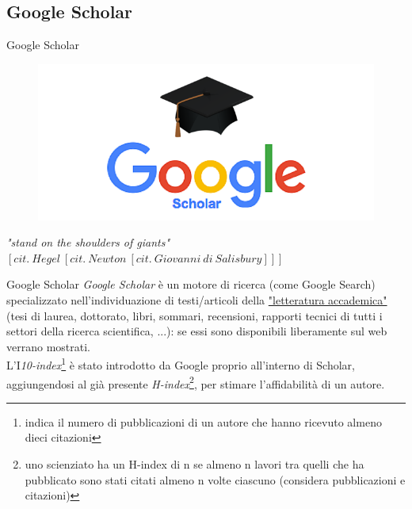 \documentclass{beamer}
\begin{document}
\subsection{Google Scholar}
\begin{frame}{Google Scholar}
\begin{figure}[h!]
\includegraphics[width=0.5\linewidth]{immagini/scholar.png}
\end{figure}
\begin{block}{}
\begin{center}
\textit{"stand on the shoulders of giants"}\\
$[cit.\ Hegel\ [cit.\ Newton\ [cit.\ Giovanni\ di\ Salisbury]]]$\\
\end{center}
\end{block}
\end{frame}
\begin{frame}{Google Scholar}
\textit{Google Scholar} è un motore di ricerca (come Google Search) specializzato nell'individuazione di testi/articoli della \underline{"letteratura accademica"} (tesi di laurea, dottorato, libri, sommari, recensioni, rapporti tecnici di tutti i settori della ricerca scientifica, ...): se essi sono disponibili liberamente sul web verrano mostrati.\\
\medskip L'\textit{$\mathrm{I}$10-index}\footnote{indica il numero di pubblicazioni di un autore che hanno ricevuto almeno dieci citazioni} è stato introdotto da Google proprio all'interno di Scholar, aggiungendosi al già presente \textit{H-index}\footnote{uno scienziato ha un H-index di n se almeno n lavori tra quelli che ha pubblicato sono stati citati almeno n volte ciascuno (considera pubblicazioni e citazioni)}, per stimare l'affidabilità di un autore.
\end{frame}
\end{document}
